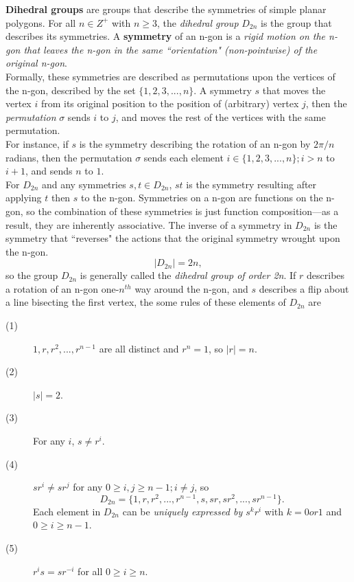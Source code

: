 \documentclass[12pt,letterpaper]{article}
\begin{document}
\textbf{Dihedral groups} are groups that describe the symmetries of simple planar polygons. For all $n \in Z^{+}$ with $n \geq 3$, the \textit{dihedral group} $D_{2n}$ is the group that describes its symmetries. A \textbf{symmetry} of an n-gon is a \textit{rigid motion on the n-gon that leaves the n-gon in the same ``orientation" (non-pointwise) of the original n-gon}. \\

Formally, these symmetries are described as permutations upon the vertices of the n-gon, described by the set $\{1, 2, 3, ..., n\}$. A symmetry $s$ that moves the vertex $i$ from its original position to the position of (arbitrary) vertex $j$, then the \textit{permutation} $\sigma$ sends $i$ to $j$, and moves the rest of the vertices with the same permutation. \\

For instance, if $s$ is the symmetry describing the rotation of an n-gon by $2\pi/n$ radians, then the permutation $\sigma$ sends each element $i \in \{1, 2, 3, ..., n\}; i > n$ to $i + 1$, and sends $n$ to $1$. \\

For $D_{2n}$ and any symmetries $s, t \in D_{2n}$, $st$ is the symmetry resulting after applying $t$ then $s$ to the n-gon. Symmetries on a n-gon are functions on the n-gon, so the combination of these symmetries is just function composition---as a result, they are inherently associative. The inverse of a symmetry in $D_{2n}$ is the symmetry that ``reverses" the actions that the original symmetry wrought upon the n-gon. \\

$$|D_{2n}| = 2n,$$ so the group $D_{2n}$ is generally called the \textit{dihedral group of order 2n}. If $r$ describes a rotation of an n-gon one-$n^{th}$ way around the n-gon, and $s$ describes a flip about a line bisecting the first vertex, the some rules of these elements of $D_{2n}$ are

\begin{description}
	\item[(1)] $1, r, r^{2}, ..., r^{n-1}$ are all distinct and $r^{n} = 1$, so $|r| = n$.
	\item[(2)] $|s| = 2$.  
	\item[(3)] For any $i$, $s \neq r^{i}$.
	\item[(4)] $sr^{i} \neq sr^{j}$ for any $0 \geq i, j \geq n-1; i \neq j$, so $$D_{2n} = \{1, r, r^{2}, ..., r^{n-1}, s, sr, sr^{2}, ..., sr^{n-1}\}.$$ Each element in $D_{2n}$ can be \textit{uniquely expressed by $s^{k}r^{i}$} with $k = 0 or 1$ and $0 \geq i \geq n-1$.
	\item[(5)] $r^{i}s = sr^{-i}$ for all $0 \geq i \geq n$.
\end{description}
\end{document}
